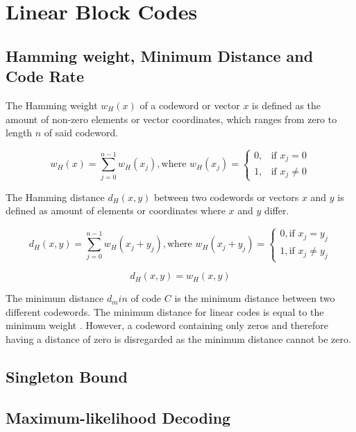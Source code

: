 \documentclass[../main.tex]{subfiles}
\begin{document}
    \chapter{Linear Block Codes}

    \section{Hamming weight, Minimum Distance and Code Rate}
    The Hamming weight $w_H(x)$ of a codeword or vector $x$ is defined as the amount of non-zero elements or vector coordinates, which ranges from zero to length $n$ of said codeword.

    \begin{equation*}
        w_H(x) = \sum_{j=0}^{n-1} w_H(x_j), \text{where } w_H(x_j) = \begin{cases} 0, &\text{if } x_j = 0 \\ 1, &\text{if } x_j \neq 0 \end{cases}
    \end{equation*}

    The Hamming distance $d_H(x,y)$ between two codewords or vectors $x$ and $y$ is defined as amount of elements or coordinates where $x$ and $y$ differ.

    \begin{equation*}
        d_H(x,y) = \sum_{j=0}^{n-1} w_H(x_j+y_j), \text{where } w_H(x_j+y_j) = \begin{cases} 0, \text{if } x_j=y_j \\ 1, \text{if } x_j \neq y_j \end{cases}
    \end{equation*}

    \begin{equation*}
        d_H(x,y) =  w_H(x,y)
    \end{equation*}

The minimum distance $d_min$ of code $C$ is the minimum distance between two different codewords. The minimum distance for linear codes is equal to the minimum weight \autocite{bossert1999channel}. However, a codeword containing only zeros and therefore having a distance of zero is disregarded as the minimum distance cannot be zero.

    \section{Singleton Bound}


    \section{Maximum-likelihood Decoding}
\end{document}

